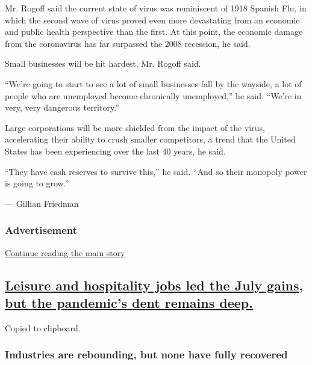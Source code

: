 Mr. Rogoff said the current state of virus was reminiscent of 1918
Spanish Flu, in which the second wave of virus proved even more
devastating from an economic and public health perspective than the
first. At this point, the economic damage from the coronavirus has far
surpassed the 2008 recession, he said.

Small businesses will be hit hardest, Mr. Rogoff said.

``We're going to start to see a lot of small businesses fall by the
wayside, a lot of people who are unemployed become chronically
unemployed,'' he said. ``We're in very, very dangerous territory.''

Large corporations will be more shielded from the impact of the virus,
accelerating their ability to crush smaller competitors, a trend that
the United States has been experiencing over the last 40 years, he said.

``They have cash reserves to survive this,'' he said. ``And so their
monopoly power is going to grow.''

--- Gillian Friedman

\hypertarget{advertisement-1}{%
\subsubsection{Advertisement}\label{advertisement-1}}

\protect\hyperlink{after-dfp-ad-mid2}{Continue reading the main story}

\hypertarget{leisure-and-hospitality-jobs-led-the-july-gains-but-the-pandemics-dent-remains-deep}{%
\subsection{\texorpdfstring{\protect\hyperlink{leisure-and-hospitality-jobs-led-the-july-gains-but-the-pandemics-dent-remains-deep}{Leisure
and hospitality jobs led the July gains, but the pandemic's dent remains
deep.}}{Leisure and hospitality jobs led the July gains, but the pandemic's dent remains deep.}}\label{leisure-and-hospitality-jobs-led-the-july-gains-but-the-pandemics-dent-remains-deep}}

Copied to clipboard.

\hypertarget{industries-are-rebounding-but-none-have-fully-recovered}{%
\subsubsection{Industries are rebounding, but none have fully
recovered}\label{industries-are-rebounding-but-none-have-fully-recovered}}

